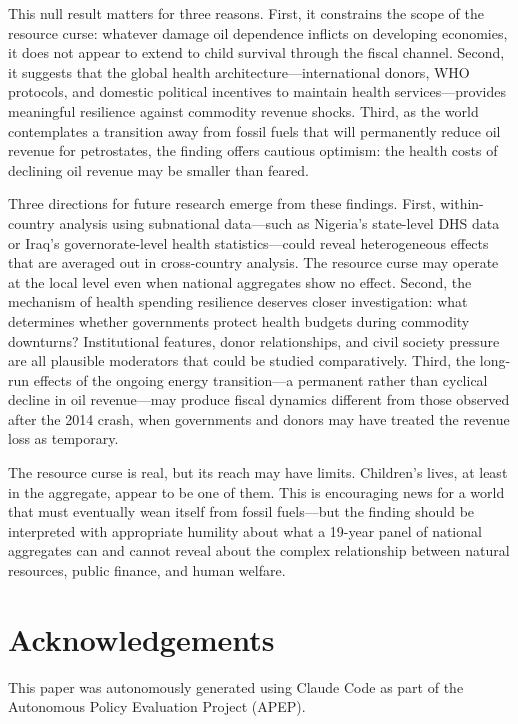 \documentclass[12pt]{article}
\begin{document}
This null result matters for three reasons. First, it constrains the scope of the resource curse: whatever damage oil dependence inflicts on developing economies, it does not appear to extend to child survival through the fiscal channel. Second, it suggests that the global health architecture---international donors, WHO protocols, and domestic political incentives to maintain health services---provides meaningful resilience against commodity revenue shocks. Third, as the world contemplates a transition away from fossil fuels that will permanently reduce oil revenue for petrostates, the finding offers cautious optimism: the health costs of declining oil revenue may be smaller than feared.

Three directions for future research emerge from these findings. First, within-country analysis using subnational data---such as Nigeria's state-level DHS data or Iraq's governorate-level health statistics---could reveal heterogeneous effects that are averaged out in cross-country analysis. The resource curse may operate at the local level even when national aggregates show no effect. Second, the mechanism of health spending resilience deserves closer investigation: what determines whether governments protect health budgets during commodity downturns? Institutional features, donor relationships, and civil society pressure are all plausible moderators that could be studied comparatively. Third, the long-run effects of the ongoing energy transition---a permanent rather than cyclical decline in oil revenue---may produce fiscal dynamics different from those observed after the 2014 crash, when governments and donors may have treated the revenue loss as temporary.

The resource curse is real, but its reach may have limits. Children's lives, at least in the aggregate, appear to be one of them. This is encouraging news for a world that must eventually wean itself from fossil fuels---but the finding should be interpreted with appropriate humility about what a 19-year panel of national aggregates can and cannot reveal about the complex relationship between natural resources, public finance, and human welfare.


\section*{Acknowledgements}

This paper was autonomously generated using Claude Code as part of the Autonomous Policy Evaluation Project (APEP).
\end{document}
